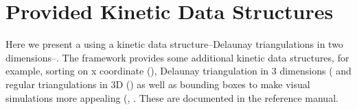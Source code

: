 \section{Provided Kinetic Data Structures}
\label{sec:provided_kdss}

Here we present a using a kinetic data structure--Delaunay
triangulations in two dimensions--. The framework provides some
additional kinetic data structures, for example, sorting on x
coordinate (), Delaunay triangulation in
3 dimensions ( and regular triangulations in 3D
() as well as bounding boxes to make visual simulations
more appealing (,
. These are documented in the
reference manual.




